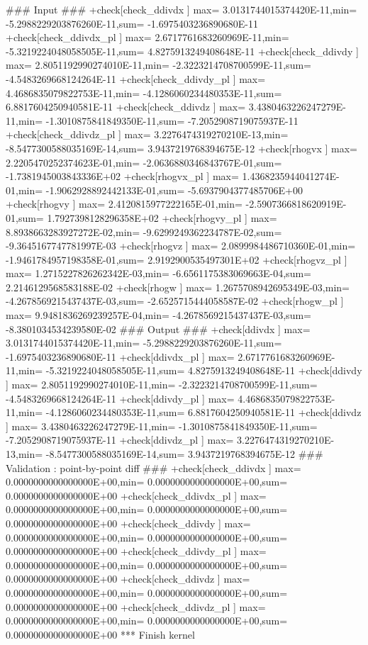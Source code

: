 \begin{LstLog}
 ### Input ###
 +check[check_ddivdx    ] max=  3.0131744015374420E-11,min= -5.2988229203876260E-11,sum= -1.6975403236890680E-11
 +check[check_ddivdx_pl ] max=  2.6717761683260969E-11,min= -5.3219224048058505E-11,sum=  4.8275913249408648E-11
 +check[check_ddivdy    ] max=  2.8051192990274010E-11,min= -2.3223214708700599E-11,sum= -4.5483269668124264E-11
 +check[check_ddivdy_pl ] max=  4.4686835079822753E-11,min= -4.1286060234480353E-11,sum=  6.8817604250940581E-11
 +check[check_ddivdz    ] max=  3.4380463226247279E-11,min= -1.3010875841849350E-11,sum= -7.2052908719075937E-11
 +check[check_ddivdz_pl ] max=  3.2276474319270210E-13,min= -8.5477300588035169E-14,sum=  3.9437219768394675E-12
 +check[rhogvx          ] max=  2.2205470252374623E-01,min= -2.0636880346843767E-01,sum= -1.7381945003843336E+02
 +check[rhogvx_pl       ] max=  1.4368235944041274E-01,min= -1.9062928892442133E-01,sum= -5.6937904377485706E+00
 +check[rhogvy          ] max=  2.4120815977222165E-01,min= -2.5907366818620919E-01,sum=  1.7927398128296358E+02
 +check[rhogvy_pl       ] max=  8.8938663283927272E-02,min= -9.6299249362234787E-02,sum= -9.3645167747781997E-03
 +check[rhogvz          ] max=  2.0899984486710360E-01,min= -1.9461784957198358E-01,sum=  2.9192900535497301E+02
 +check[rhogvz_pl       ] max=  1.2715227826262342E-03,min= -6.6561175383069663E-04,sum=  2.2146129568583188E-02
 +check[rhogw           ] max=  1.2675708942695349E-03,min= -4.2678569215437437E-03,sum= -2.6525715444058587E-02
 +check[rhogw_pl        ] max=  9.9481836269239257E-04,min= -4.2678569215437437E-03,sum= -8.3801034534239580E-02
 ### Output ###
 +check[ddivdx          ] max=  3.0131744015374420E-11,min= -5.2988229203876260E-11,sum= -1.6975403236890680E-11
 +check[ddivdx_pl       ] max=  2.6717761683260969E-11,min= -5.3219224048058505E-11,sum=  4.8275913249408648E-11
 +check[ddivdy          ] max=  2.8051192990274010E-11,min= -2.3223214708700599E-11,sum= -4.5483269668124264E-11
 +check[ddivdy_pl       ] max=  4.4686835079822753E-11,min= -4.1286060234480353E-11,sum=  6.8817604250940581E-11
 +check[ddivdz          ] max=  3.4380463226247279E-11,min= -1.3010875841849350E-11,sum= -7.2052908719075937E-11
 +check[ddivdz_pl       ] max=  3.2276474319270210E-13,min= -8.5477300588035169E-14,sum=  3.9437219768394675E-12
 ### Validation : point-by-point diff ###
 +check[check_ddivdx    ] max=  0.0000000000000000E+00,min=  0.0000000000000000E+00,sum=  0.0000000000000000E+00
 +check[check_ddivdx_pl ] max=  0.0000000000000000E+00,min=  0.0000000000000000E+00,sum=  0.0000000000000000E+00
 +check[check_ddivdy    ] max=  0.0000000000000000E+00,min=  0.0000000000000000E+00,sum=  0.0000000000000000E+00
 +check[check_ddivdy_pl ] max=  0.0000000000000000E+00,min=  0.0000000000000000E+00,sum=  0.0000000000000000E+00
 +check[check_ddivdz    ] max=  0.0000000000000000E+00,min=  0.0000000000000000E+00,sum=  0.0000000000000000E+00
 +check[check_ddivdz_pl ] max=  0.0000000000000000E+00,min=  0.0000000000000000E+00,sum=  0.0000000000000000E+00
 *** Finish kernel
\end{LstLog}

